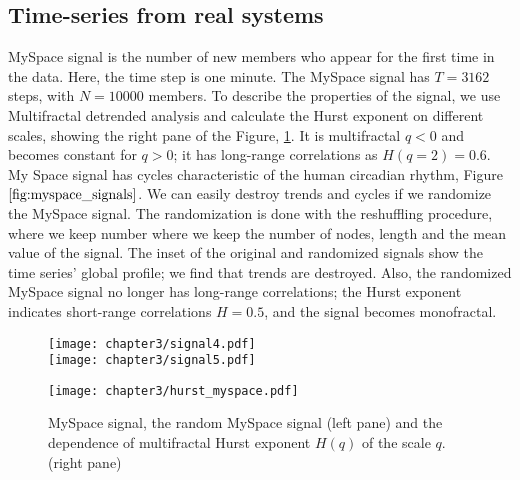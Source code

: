\subsection{Time-series from real systems}

MySpace signal is the number of new members who appear for the first time in the data. Here, the time step is one minute. The MySpace signal has $T = 3162$ steps, with  $N = 10000$ members. To describe the properties of the signal, we use Multifractal detrended analysis and calculate the Hurst exponent on different scales, showing the right pane of the Figure, \ref{fig:myspace_signals}. It is multifractal $q<0$ and becomes constant for $q>0$; it has long-range correlations as $H(q=2)=0.6$. My Space signal has cycles characteristic of the human circadian rhythm, Figure $\ref{fig:myspace_signals}$. We can easily destroy trends and cycles if we randomize the MySpace signal. The randomization is done with the reshuffling procedure, where we keep number where we keep the number of nodes, length and the mean value of the signal. The inset of the original and randomized signals show the time series' global profile; we find that trends are destroyed. Also, the randomized MySpace signal no longer has long-range correlations; the Hurst exponent indicates short-range correlations $H=0.5$, and the signal becomes monofractal.    


\begin{figure}[H]
	\centering
	\begin{minipage}[b]{0.4\textwidth}
		\centering
		\texttt{[image: chapter3/signal4.pdf]}\\
		\texttt{[image: chapter3/signal5.pdf]}
	\end{minipage}
	\begin{minipage}[b]{0.45\textwidth}
		\centering
		\texttt{[image: chapter3/hurst\_myspace.pdf]}
		\vspace{0.01cm}
	\end{minipage}
	\caption[Properties of MySpace signal.]{MySpace signal, the random MySpace signal (left pane) and the dependence of multifractal Hurst exponent $H(q)$ of the scale $q$. (right pane)}
	\label{fig:myspace_signals}
\end{figure}

